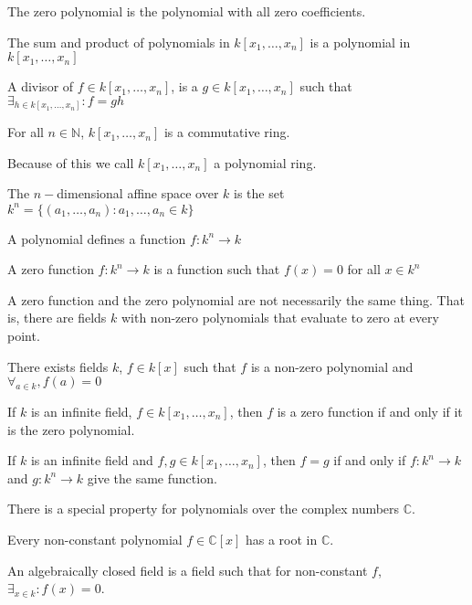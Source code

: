 \documentclass[crop=false,class=book,oneside]{standalone}
\begin{document}
\begin{definition}
The zero polynomial is the polynomial with all zero coefficients.
\end{definition}
\begin{theorem}
The sum and product of polynomials in $k[x_1,\hdots ,x_n]$ is a polynomial in $k[x_1,\hdots ,x_n]$
\end{theorem}
\begin{definition}
A divisor of $f\in k[x_{1},\hdots ,x_{n}]$, is a $g\in k[x_{1},\hdots,x_{n}]$ such that $\exists_{h\in k[x_{1},\hdots,x_{n}]}:f = gh$
\end{definition}
\begin{theorem}
For all $n\in\mathbb{N}$, $k[x_1,\hdots ,x_n]$ is a commutative ring.
\end{theorem}
\begin{remark}
Because of this we call $k[x_1,\hdots ,x_n]$ a polynomial ring.
\end{remark}
\begin{definition}
The $n-$dimensional affine space over $k$ is the set $k^{n}=\{(a_1,\hdots, a_n):a_1,\hdots,a_n \in k\}$
\end{definition}
\begin{remark}
A polynomial defines a function $f:k^n \rightarrow k$
\end{remark}
\begin{definition}
A zero function $f:k^n \rightarrow k$ is a function such that $f(x) = 0$ for all $x\in k^n$
\end{definition}
\begin{remark}
A zero function and the zero polynomial are not necessarily the same thing. That is, there are fields $k$ with non-zero polynomials that evaluate to zero at every point.
\end{remark}
\begin{theorem}
There exists fields $k$, $f\in k[x]$ such that $f$ is a non-zero polynomial and $\forall_{a\in k},f(a)=0$
\end{theorem}
\begin{theorem}
If $k$ is an infinite field, $f\in k[x_1,\hdots ,x_n]$, then $f$ is a zero function if and only if it is the zero polynomial.
\end{theorem}
\begin{theorem}
If $k$ is an infinite field and $f,g\in k[x_1,\hdots ,x_n]$, then $f=g$ if and only if $f:k^n\rightarrow k$ and $g:k^n \rightarrow k$ give the same function.
\end{theorem}
There is a special property for polynomials over the complex numbers $\mathbb{C}$.
\begin{theorem}
Every non-constant polynomial $f\in \mathbb{C}[x]$ has a root in $\mathbb{C}$.
\end{theorem}
\begin{definition}
An algebraically closed field is a field such that for non-constant $f$, $\exists_{x\in k}:f(x)=0$.
\end{definition}
\end{document}
